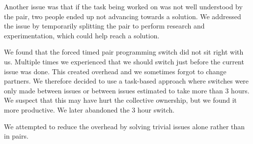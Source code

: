Another issue was that if the task being worked on was not well understood by the pair, two people ended up not advancing towards a solution. We addressed the issue by temporarily splitting the pair to perform research and experimentation, which could help reach a solution.

We found that the forced timed pair programming switch did not sit right with us. Multiple times we experienced that we should switch just before the current issue was done. This created overhead and we sometimes forgot to change partners. 
We therefore decided to use a task-based approach where switches were only made between issues or between issues estimated to take more than 3 hours. We suspect that this may have hurt the collective ownership, but we found it more productive. We later abandoned the 3 hour switch.

We attempted to reduce the overhead by solving trivial issues alone rather than in pairs. 
